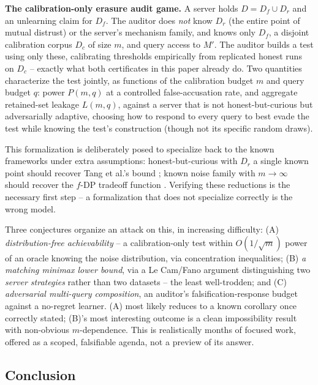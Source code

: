 \documentclass[10pt,journal,compsoc]{IEEEtran}
\begin{document}
\textbf{The calibration-only erasure audit game.} A server holds $D=D_f\cup D_r$ and an unlearning claim for $D_f$. The auditor does \emph{not} know $D_r$ (the entire point of mutual distrust) or the server's mechanism family, and knows only $D_f$, a disjoint calibration corpus $D_c$ of size $m$, and query access to $M'$. The auditor builds a test using only these, calibrating thresholds empirically from replicated honest runs on $D_c$ -- exactly what both certificates in this paper already do. Two quantities characterize the test jointly, as functions of the calibration budget $m$ and query budget $q$: power $P(m,q)$ at a controlled false-accusation rate, and aggregate retained-set leakage $L(m,q)$, against a server that is not honest-but-curious but adversarially adaptive, choosing how to respond to every query to best evade the test while knowing the test's construction (though not its specific random draws).

This formalization is deliberately posed to specialize back to the known frameworks under extra assumptions: honest-but-curious with $D_r$ a single known point should recover Tang et al.'s bound \cite{tang2026geometric}; known noise family with $m\to\infty$ should recover the $f$-DP tradeoff function \cite{dong2022gdp}. Verifying these reductions is the necessary first step -- a formalization that does not specialize correctly is the wrong model.

Three conjectures organize an attack on this, in increasing difficulty: (A) \emph{distribution-free achievability} -- a calibration-only test within $O(1/\sqrt m)$ power of an oracle knowing the noise distribution, via concentration inequalities; (B) \emph{a matching minimax lower bound}, via a Le Cam/Fano argument distinguishing two \emph{server strategies} rather than two datasets -- the least well-trodden; and (C) \emph{adversarial multi-query composition}, an auditor's falsification-response budget against a no-regret learner. (A) most likely reduces to a known corollary once correctly stated; (B)'s most interesting outcome is a clean impossibility result with non-obvious $m$-dependence. This is realistically months of focused work, offered as a scoped, falsifiable agenda, not a preview of its answer.

\subsection{Conclusion}
\end{document}
